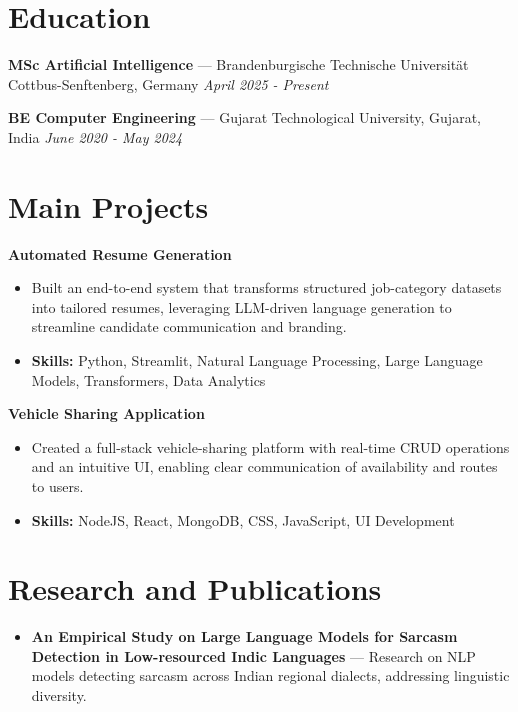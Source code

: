 \documentclass[a4paper,10pt]{article}
\begin{document}
\section*{Education}
\textbf{MSc Artificial Intelligence} — Brandenburgische Technische Universität Cottbus-Senftenberg, Germany \hfill \textit{April 2025 - Present}\par
\vspace{1.5pt}
\textbf{BE Computer Engineering} — Gujarat Technological University, Gujarat, India \hfill \textit{June 2020 - May 2024}\par

\section*{Main Projects}
\textbf{Automated Resume Generation}\par
\vspace{1pt}
\begin{itemize}
  \item Built an end-to-end system that transforms structured job-category datasets into tailored resumes, leveraging LLM-driven language generation to streamline candidate communication and branding.
  \item \textbf{Skills:} Python, Streamlit, Natural Language Processing, Large Language Models, Transformers, Data Analytics
\end{itemize}
\vspace{3pt}
\textbf{Vehicle Sharing Application}\par
\vspace{1pt}
\begin{itemize}
  \item Created a full-stack vehicle-sharing platform with real-time CRUD operations and an intuitive UI, enabling clear communication of availability and routes to users.
  \item \textbf{Skills:} NodeJS, React, MongoDB, CSS, JavaScript, UI Development
\end{itemize}

\section*{Research and Publications}
\begin{itemize}
\item \textbf{An Empirical Study on Large Language Models for Sarcasm Detection in Low-resourced Indic Languages} — Research on NLP models detecting sarcasm across Indian regional dialects, addressing linguistic diversity.
\end{itemize}
\end{document}

